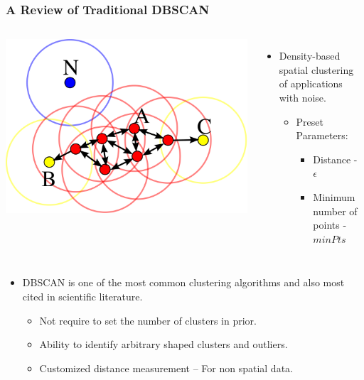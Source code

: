 \begin{frame}
    \frametitle{A Review of Traditional DBSCAN}
    \begin{columns}
             \centering
             \includegraphics[width=\textwidth]{resource/figures/dbscan.png}
              \begin{itemize}
                  \item Density-based spatial clustering of applications with noise.
                  \begin{itemize}
                      \item Preset Parameters:
                      \begin{itemize}
                          \item Distance - $\epsilon$
                          \item Minimum number of points - $minPts$
                      \end{itemize}
                  \end{itemize}
              \end{itemize}
    \end{columns} 
    \vspace{0.3cm}
    \begin{itemize}
        \item DBSCAN is one of the most common clustering algorithms and also most cited in scientific literature.
        \begin{itemize}
            \item Not require to set the number of clusters in prior.
            \item Ability to identify arbitrary shaped clusters and outliers.
            \item Customized distance measurement – For non spatial data.
        \end{itemize}
    \end{itemize}
\end{frame}

